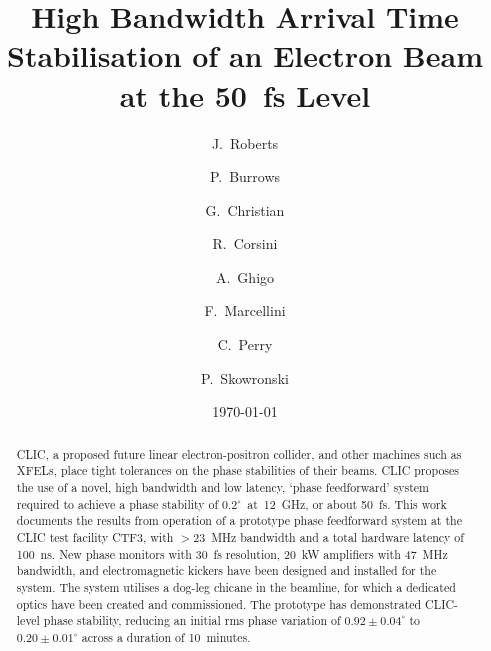 \documentclass[%
 reprint,
superscriptaddress,
 amsmath,amssymb,
 prl,
]{revtex4-1}
\begin{document}

\title{High Bandwidth Arrival Time Stabilisation of an Electron Beam at 
the 
50~fs Level}

\author{J.~Roberts}

\author{P.~Burrows}

\author{G.~Christian}

\author{R.~Corsini}

\author{A.~Ghigo}

\author{F.~Marcellini}

\author{C.~Perry}

\author{P.~Skowronski}

\date{\today}

\begin{abstract}
CLIC, a proposed future linear electron-positron collider, and other machines 
such as XFELs, place tight tolerances on the phase stabilities of their beams. 
CLIC proposes the use of a novel, high bandwidth and low latency, `phase 
feedforward' system required to achieve a phase stability of 
\(0.2^\circ\)~at~12~GHz, or 
about 50~fs. This work documents the results from operation of a prototype 
phase 
feedforward system at the CLIC test facility CTF3, with \(>23\)~MHz bandwidth 
and a 
total hardware latency of 100~ns. New phase monitors with 
30~fs resolution, 20~kW amplifiers with 47~MHz bandwidth, and electromagnetic 
kickers have been designed and installed for the system. The system utilises a 
dog-leg chicane in the beamline, for which a dedicated optics have been created 
and 
commissioned. The prototype has demonstrated CLIC-level phase stability, 
reducing an initial rms phase variation of \(0.92\pm0.04^\circ\) to 
\(0.20\pm0.01^\circ\) across a duration of 10~minutes.
\end{abstract}

\maketitle
\end{document}
